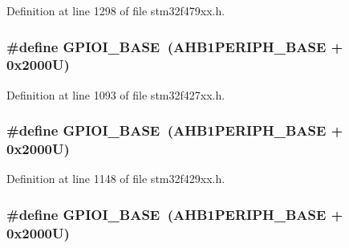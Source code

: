 Definition at line 1298 of file stm32f479xx.\+h.

\subsubsection[{\texorpdfstring{G\+P\+I\+O\+I\+\_\+\+B\+A\+SE}{GPIOI_BASE}}]{\setlength{\rightskip}{0pt plus 5cm}\#define G\+P\+I\+O\+I\+\_\+\+B\+A\+SE~({\bf A\+H\+B1\+P\+E\+R\+I\+P\+H\+\_\+\+B\+A\+SE} + 0x2000\+U)}\hypertarget{group___peripheral__memory__map_ga50acf918c2e1c4597d5ccfe25eb3ad3d}{}\label{group___peripheral__memory__map_ga50acf918c2e1c4597d5ccfe25eb3ad3d}


Definition at line 1093 of file stm32f427xx.\+h.

\subsubsection[{\texorpdfstring{G\+P\+I\+O\+I\+\_\+\+B\+A\+SE}{GPIOI_BASE}}]{\setlength{\rightskip}{0pt plus 5cm}\#define G\+P\+I\+O\+I\+\_\+\+B\+A\+SE~({\bf A\+H\+B1\+P\+E\+R\+I\+P\+H\+\_\+\+B\+A\+SE} + 0x2000\+U)}\hypertarget{group___peripheral__memory__map_ga50acf918c2e1c4597d5ccfe25eb3ad3d}{}\label{group___peripheral__memory__map_ga50acf918c2e1c4597d5ccfe25eb3ad3d}


Definition at line 1148 of file stm32f429xx.\+h.

\subsubsection[{\texorpdfstring{G\+P\+I\+O\+I\+\_\+\+B\+A\+SE}{GPIOI_BASE}}]{\setlength{\rightskip}{0pt plus 5cm}\#define G\+P\+I\+O\+I\+\_\+\+B\+A\+SE~({\bf A\+H\+B1\+P\+E\+R\+I\+P\+H\+\_\+\+B\+A\+SE} + 0x2000\+U)}\hypertarget{group___peripheral__memory__map_ga50acf918c2e1c4597d5ccfe25eb3ad3d}{}\label{group___peripheral__memory__map_ga50acf918c2e1c4597d5ccfe25eb3ad3d}


